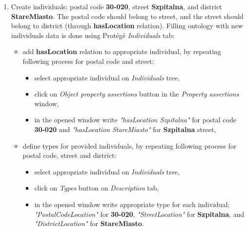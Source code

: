 \begin{enumerate}
    \setlength{\itemsep}{0cm}
    \setlength{\parskip}{0cm}

    \item Create individuals: postal code \textbf{30-020}, street \textbf{Szpitalna}, and district \textbf{StareMiasto}. The postal code should belong to street, and the street should belong to district (through \textbf{hasLocation} relation). Filling ontology with new individuals data is done using Protégé \textit{Individuals} tab:
    \begin{itemize}
        \setlength{\itemsep}{0cm}
        \setlength{\parskip}{0cm}

        \item add \textbf{hasLocation} relation to appropriate individual, by repeating following process for postal code and street:
        \begin{itemize}
            \setlength{\itemsep}{0cm}
            \setlength{\parskip}{0cm}

            \item select appropriate individual on \textit{Individuals} tree,
            \item click on \textit{Object property assertions} button in the \textit{Property assertions} window,
            \item in the opened window write \textit{"hasLocation Szpitalna"} for postal code \textbf{30-020} and \textit{"hasLocation StareMiasto"} for \textbf{Szpitalna} street,
        \end{itemize}

        \item define types for provided individuals, by repeating following process for postal code, street and district:
        \begin{itemize}
            \setlength{\itemsep}{0cm}
            \setlength{\parskip}{0cm}

            \item select appropriate individual on \textit{Individuals} tree,
            \item click on \textit{Types} button on \textit{Description} tab,
            \item in the opened window write appropriate type for each individual: \textit{"PostalCodeLocation"} for \textbf{30-020}, \textit{"StreetLocation"} for \textbf{Szpitalna}, and \textit{"DistrictLocation"} for \textbf{StareMiasto}.
        \end{itemize}


\end{itemize}
\end{enumerate}
